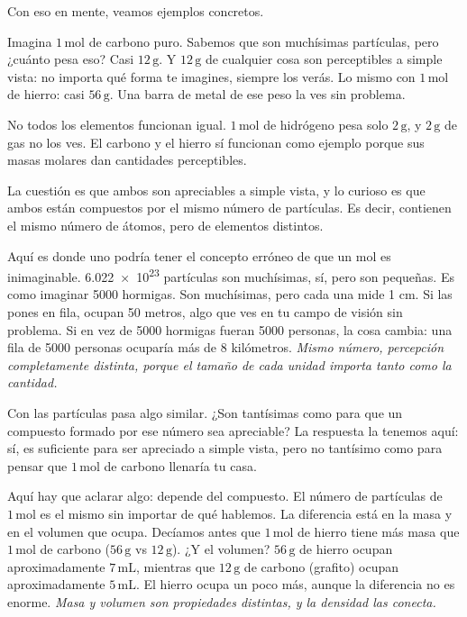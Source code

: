 \medskip
Con eso en mente, veamos ejemplos concretos.

Imagina $1\,\mathrm{mol}$ de carbono puro. Sabemos que son muchísimas 
partículas, pero ¿cuánto pesa eso? Casi $12\,\mathrm{g}$. Y $12\,\mathrm{g}$ de 
cualquier cosa son perceptibles a simple vista: no importa qué forma te 
imagines, siempre los verás. Lo mismo con $1\,\mathrm{mol}$ de hierro: casi 
$56\,\mathrm{g}$. Una barra de metal de ese peso la ves sin problema.

No todos los elementos funcionan igual. $1\,\mathrm{mol}$ de hidrógeno pesa 
solo $2\,\mathrm{g}$, y $2\,\mathrm{g}$ de gas no los ves. El carbono y el 
hierro sí funcionan como ejemplo porque sus masas molares dan cantidades 
perceptibles.

La cuestión es que ambos son apreciables a simple vista, y lo curioso es que 
ambos están compuestos por el mismo número de partículas. Es decir, contienen 
el mismo número de átomos, pero de elementos distintos.

\medskip
Aquí es donde uno podría tener el concepto erróneo de que un mol es 
inimaginable. \num{6.022e23} partículas son muchísimas, sí, pero son 
pequeñas. Es como imaginar 5000 hormigas. Son muchísimas, pero cada una mide 
1 cm. Si las pones en fila, ocupan 50 metros, algo que ves en tu campo de 
visión sin problema. Si en vez de 5000 hormigas fueran 5000 personas, la cosa 
cambia: una fila de 5000 personas ocuparía más de 8 kilómetros. \textit{Mismo 
número, percepción completamente distinta, porque el tamaño de cada unidad 
importa tanto como la cantidad.}

Con las partículas pasa algo similar. ¿Son tantísimas como para que un 
compuesto formado por ese número sea apreciable? La respuesta la tenemos aquí: 
sí, es suficiente para ser apreciado a simple vista, pero no tantísimo como 
para pensar que $1\,\mathrm{mol}$ de carbono llenaría tu casa.

\medskip
Aquí hay que aclarar algo: depende del compuesto. El número de partículas de 
$1\,\mathrm{mol}$ es el mismo sin importar de qué hablemos. La diferencia está 
en la masa y en el volumen que ocupa. Decíamos antes que $1\,\mathrm{mol}$ de 
hierro tiene más masa que $1\,\mathrm{mol}$ de carbono ($56\,\mathrm{g}$ vs 
$12\,\mathrm{g}$). ¿Y el volumen? $56\,\mathrm{g}$ de hierro ocupan 
aproximadamente $7\,\mathrm{mL}$, mientras que $12\,\mathrm{g}$ de carbono 
(grafito) ocupan aproximadamente $5\,\mathrm{mL}$. El hierro ocupa un poco 
más, aunque la diferencia no es enorme. \textit{Masa y volumen son propiedades 
distintas, y la densidad las conecta.}

